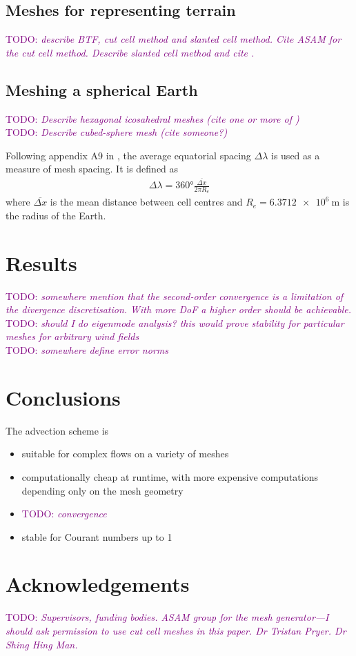 \documentclass[times]{elsarticle}
\newcommand{\TODO}[1]{\textcolor{purple}{TODO: \emph{#1}}}
\begin{document}
\subsection{Meshes for representing terrain}
\label{sec:meshes-terrain}

\TODO{describe BTF, cut cell method and slanted cell method.  Cite ASAM for the cut cell method.  Describe slanted cell method and cite \citep{shaw-weller2016}.}


\subsection{Meshing a spherical Earth}

\TODO{Describe hexagonal icosahedral meshes (cite one or more of \citep{thuburn2014,heikes-randall1995a,heikes-randall1995b})} \\
\TODO{Describe cubed-sphere mesh (cite someone?)}

Following appendix A9 in \citep{lauritzen2014}, the average equatorial spacing $\Delta \lambda$ is used as a measure of mesh spacing.  It is defined as
\begin{align}
	\Delta \lambda = \ang{360} \frac{\overline{\Delta x}}{2 \pi R_e}
\end{align}
where $\overline{\Delta x}$ is the mean distance between cell centres and $R_e = \SI{6.3712e6}{\meter}$ is the radius of the Earth.



\section{Results}
\label{sec:results}

\TODO{somewhere mention that the second-order convergence is a limitation of the divergence discretisation.  With more DoF a higher order should be achievable.} \\
\TODO{should I do eigenmode analysis?  this would prove stability for particular meshes for arbitrary wind fields} \\
\TODO{somewhere define error norms}





\section{Conclusions}

The advection scheme is
\begin{itemize}
	\item suitable for complex flows on a variety of meshes
	\item computationally cheap at runtime, with more expensive computations depending only on the mesh geometry
	\item \TODO{convergence}
	\item stable for Courant numbers up to 1
\end{itemize}

\section{Acknowledgements}
\TODO{Supervisors, funding bodies.  ASAM group for the mesh generator---I should ask permission to use cut cell meshes in this paper.  Dr Tristan Pryer.  Dr Shing Hing Man.}





\end{document}
